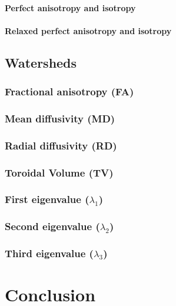 \documentclass[a4paper,11pt]{report}
\begin{document}
      \subsubsection{Perfect anisotropy and isotropy}
      \subsubsection{Relaxed perfect anisotropy and isotropy}

  \section{Watersheds}
    \subsection{Fractional anisotropy (FA)}
    \subsection{Mean diffusivity (MD)}
    \subsection{Radial diffusivity (RD)}
    \subsection{Toroidal Volume (TV)}
    \subsection{First eigenvalue ($\lambda_1$)}
    \subsection{Second eigenvalue ($\lambda_2$)}
    \subsection{Third eigenvalue ($\lambda_3$)}

\chapter{Conclusion}
\end{document}
